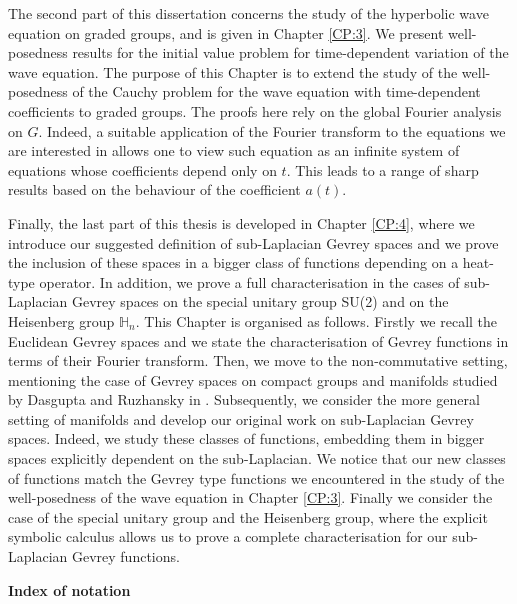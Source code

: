 \documentclass[12pt,oneside,a4paper]{book}
\numberwithin{equation}{section}     %
\theoremstyle{plain}
\theoremstyle{definition}
\begin{document}
The second part of this dissertation concerns the study of the hyperbolic wave equation on graded groups, and is given in Chapter \ref{CP:3}. We present well-posedness results for the initial value problem for  time-dependent variation of the wave equation. The purpose of this Chapter is to extend the study of the well-posedness of the Cauchy problem for the wave equation with time-dependent coefficients to graded groups. The proofs here rely on the global Fourier analysis on $G$. Indeed, a suitable application of the Fourier transform to the equations we are interested in allows one to view such equation as an infinite system of equations whose coefficients depend only on $t$. This leads to a range of sharp results based on the behaviour of the coefficient $a(t)$.

Finally, the last part of this thesis is developed in Chapter \ref{CP:4}, where we introduce our suggested definition of sub-Laplacian Gevrey spaces and we prove the inclusion of these spaces in a bigger class of functions depending on a heat-type operator. In addition, we prove a full characterisation in the cases of sub-Laplacian Gevrey spaces on the special unitary group SU(2) and on the Heisenberg group $\mathbb{H}_n$.
This Chapter is organised as follows. Firstly we recall the Euclidean Gevrey spaces and we state the characterisation of Gevrey functions in terms of their Fourier transform. Then, we move to the non-commutative setting, mentioning the case of Gevrey spaces on compact groups and manifolds studied by Dasgupta and Ruzhansky in \cite{DR2014}. Subsequently, we consider the more general setting of manifolds and develop our original work on sub-Laplacian Gevrey spaces. Indeed, we study these classes of functions, embedding them in bigger spaces explicitly dependent on the sub-Laplacian. We notice that our new classes of functions match the Gevrey type functions we encountered in the study of the well-posedness of the wave equation in Chapter \ref{CP:3}. Finally we consider the case of the special unitary group and the Heisenberg group, where the explicit symbolic calculus allows us to prove a complete characterisation for our sub-Laplacian Gevrey functions.  

\newpage

\textbf{Index of notation}
\end{document}
